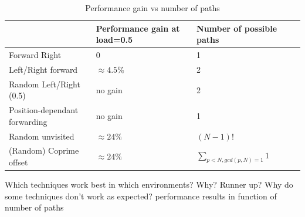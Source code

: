 \documentclass[10pt,a4paper]{article}
\begin{document}
\begin{table}
\centering
\begin{tabular}{|p{}|p{}|p{}|p{}|} \hline
 							& Performance gain at load=0.5	& Number of possible paths	\\ \hline
Forward Right				& 0								& 1							\\ \hline
Left/Right forward			& $\approx 4.5\%$				& 2							\\ \hline
Random Left/Right (0.5)		& no gain						& 2							\\ \hline
Position-dependant forwarding & no gain						& 1							\\ \hline
Random unvisited			& $\approx 24\%$						& $(N-1)!$					\\ \hline
(Random) Coprime offset		& $\approx 24\%$						& $\sum_{p < N,gcd(p, N) = 1} 1$ \\ \hline
\end{tabular}
\caption{Performance gain vs number of paths}
\end{table}

Which techniques work best in which environments? Why? Runner up? Why do some techniques don't work as expected? performance results in function of number of paths

\printbibliography
\end{document}
